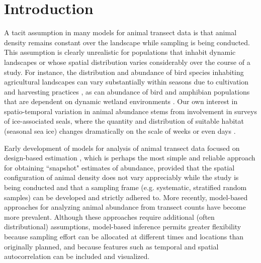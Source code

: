 \documentclass[times,mee,doublespace,]{besauth2}
\begin{document}

\maketitle \linenumbers

\def\VAR{{\rm Var}\,}
\def\COV{{\rm Cov}\,}
\def\Prob{{\rm P}\,}



\section{Introduction}

A tacit assumption in many models for animal transect data is that animal density remains constant over
the landscape while sampling is being conducted.  This assumption is clearly unrealistic for populations that inhabit dynamic landscapes or whose spatial distribution varies considerably over the course of a study. For instance, the distribution and abundance of bird species inhabiting agricultural landscapes can vary substantially within seasons due to cultivation and harvesting practices \citep{MillerEtAl11jwm}, as can abundance of bird and amphibian populations that are dependent on dynamic wetland environments \citep{MurkinEtAl1997,BabbittTanner2000}.   Our own interest in spatio-temporal variation in animal abundance stems from involvement in surveys of ice-associated seals, where the quantity and distribution of suitable habitat (seasonal sea ice) changes dramatically on the scale of weeks or even days \citep{VerHoefJansen2007,VerHoefEtAl2014}.

Early development of models for analysis of animal transect data \citep[see e.g.][and references therein]{BucklandEtAl2001} focused on design-based estimation \citep[cf.][]{Cochran1977}, which is perhaps the most simple and reliable approach for obtaining ``snapshot" estimates of abundance, provided that the spatial configuration of animal density does not vary appreciably while the study is being conducted and that a sampling frame (e.g. systematic, stratified random samples) can be developed and strictly adhered to.  More recently, model-based approaches for analyzing animal abundance from transect counts \citep[e.g.][]{HedleyBuckland2004,VerHoefJansen2007,JohnsonEtAl2010} have become more prevalent. Although these approaches require additional (often distributional) assumptions, model-based inference permits greater flexibility because sampling effort can be allocated at different times and locations than originally planned, and because features such as temporal \citep{Moore2011} and spatial \citep[see e.g.][]{MillerEtAl2013} autocorrelation can be included and visualized.
\end{document}
